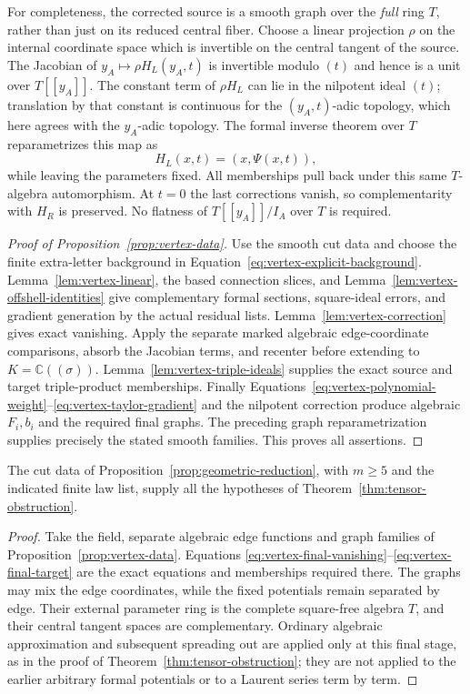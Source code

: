For completeness, the corrected source is a smooth graph over the
\emph{full} ring $T$, rather than just on its reduced central fiber.
Choose a linear projection $\rho$ on the internal coordinate space
which is invertible on the central tangent of the source.  The Jacobian
of $y_A\mapsto\rho H_L(y_A,t)$ is invertible modulo $(t)$ and hence is
a unit over $T[[y_A]]$.  The constant term of $\rho H_L$ can lie in the nilpotent ideal
$(t)$; translation by that constant is continuous for the
$(y_A,t)$-adic topology, which here agrees with the $y_A$-adic topology.
The formal inverse theorem over $T$ reparametrizes this map as
\[
 H_L(x,t)=(x,\Psi(x,t)),
\]
while leaving the parameters fixed.  All memberships pull back under
this same $T$-algebra automorphism.  At $t=0$ the last corrections
vanish, so complementarity with $H_R$ is preserved.  No flatness of
$T[[y_A]]/I_A$ over $T$ is required.

\begin{proof}[Proof of Proposition~\ref{prop:vertex-data}]
Use the smooth cut data and choose the finite extra-letter background
in Equation~\eqref{eq:vertex-explicit-background}.  Lemma~\ref{lem:vertex-linear},
the based connection slices, and Lemma~\ref{lem:vertex-offshell-identities}
give complementary formal sections, square-ideal errors, and gradient
generation by the actual residual lists.
Lemma~\ref{lem:vertex-correction} gives exact vanishing.  Apply the
separate marked algebraic edge-coordinate comparisons, absorb the
Jacobian terms, and recenter before extending to $K=\mathbb C((\sigma))$.
Lemma~\ref{lem:vertex-triple-ideals} supplies the exact source and target
triple-product memberships.  Finally
Equations~\eqref{eq:vertex-polynomial-weight}--\eqref{eq:vertex-taylor-gradient}
and the nilpotent correction produce algebraic $F_i,b_i$ and the
required final graphs.  The preceding graph reparametrization supplies
precisely the stated smooth families.  This proves all assertions.
\end{proof}

\begin{corollary}
\label{cor:vertex-tensor-interface}
The cut data of Proposition~\ref{prop:geometric-reduction}, with
$m\geq5$ and the indicated finite law list, supply all the hypotheses
of Theorem~\ref{thm:tensor-obstruction}.
\end{corollary}

\begin{proof}
Take the field, separate algebraic edge functions and graph families
of Proposition~\ref{prop:vertex-data}.  Equations
\eqref{eq:vertex-final-vanishing}--\eqref{eq:vertex-final-target} are
the exact equations and memberships required there.  The graphs may
mix the edge coordinates, while the fixed potentials remain separated
by edge.  Their external parameter ring is the complete square-free
algebra $T$, and their central tangent spaces are complementary.
Ordinary algebraic approximation and subsequent spreading out are
applied only at this final stage, as in the proof of
Theorem~\ref{thm:tensor-obstruction}; they are not applied to the earlier
arbitrary formal potentials or to a Laurent series term by term.
\end{proof}
